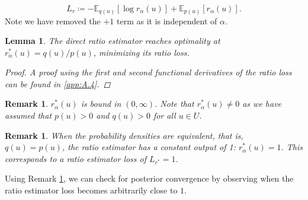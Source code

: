 \documentclass[honours,12pt, twoside]{unswthesis}
\newcommand{\E}{\mathbb{E}}
\newtheorem{lemma}[theorem]{Lemma}
\newtheorem{remark}[theorem]{Remark}
\numberwithin{equation}{section}
\theoremstyle{definition}
\begin{document}
\begin{equation}
L_r\coloneqq-\E_{q(u)}[\log r_\alpha(u)]+\E_{p(u)}[r_\alpha(u)].
\end{equation}
Note we have removed the $+1$ term as it is independent of $\alpha$.
\begin{lemma}
The direct ratio estimator reaches optimality at $r^*_\alpha(u)=q(u)/p(u)$, minimizing its ratio loss.
\begin{proof}
A proof using the first and second functional derivatives of the ratio loss can be found in \autoref{app:A.4}.
\end{proof}
\end{lemma}
\begin{remark}
$r_\alpha^*(u)$ is bound in $(0,\infty)$. Note that $r_\alpha^*(u)\neq 0$ as we have assumed that $p(u)>0$ and $q(u)>0$ for all $u\in U$.
\end{remark}
\begin{remark}\label{rem:4.2.4}
When the probability densities are equivalent, that is, $q(u)=p(u)$, the ratio estimator has a constant output of 1: $r^*_\alpha(u)=1$. This corresponds to a ratio estimator loss of $L_{r^*}=1$.
\end{remark}
Using Remark \ref{rem:4.2.4}, we can check for posterior convergence by observing when the ratio estimator loss becomes arbitrarily close to $1$.
\end{document}
